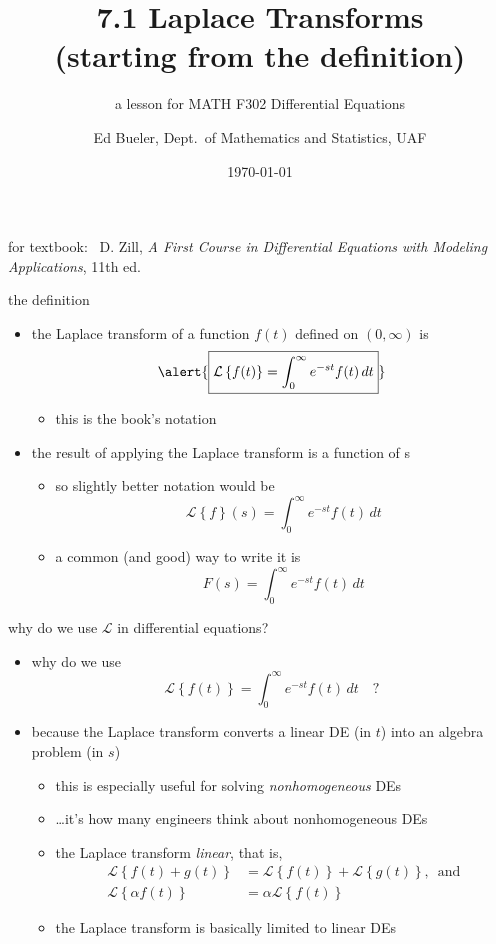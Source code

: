 \documentclass[urlcolor=blue,dvipsnames]{beamer}
\title{7.1 Laplace Transforms \\ (starting from the definition)}
\subtitle{a lesson for MATH F302 Differential Equations}
\author{Ed Bueler, Dept.~of Mathematics and Statistics, UAF}
\date{\tiny \today}
\begin{document}
\renewcommand{\thefootnote}{{\color{green} \arabic{footnote}}}

\begin{frame}
\titlepage

\centerline{\tiny for textbook: \, D. Zill, \emph{A First Course in Differential Equations with Modeling Applications}, 11th ed.}
\end{frame}

\newcommand{\LL}[1]{\mathcal{L}\left\{#1\right\}}

\begin{frame}{the definition}

\begin{itemize}
\item the \alert{Laplace transform} of a function $f(t)$ defined on $(0,\infty)$ is
    $$\alert{\boxed{\LL{f(t)} = \int_0^\infty e^{-st} f(t)\,dt}}$$

\vspace{-2mm}
    \begin{itemize}
    \item this is the book's notation
    \end{itemize}
\item the \alert{result} of applying the Laplace transform \alert{is a function of s}
    \begin{itemize}
    \item  so slightly better notation would be
    $$\LL{f}(s) = \int_0^\infty e^{-st} f(t)\,dt$$
    \item a common (and good) way to write it is
    $$F(s) = \int_0^\infty e^{-st} f(t)\,dt$$
    \end{itemize}
\end{itemize}
\end{frame}


\begin{frame}{why do we use $\mathcal{L}$ in differential equations?}

\begin{itemize}
\item why do we use
    $$\LL{f(t)} = \int_0^\infty e^{-st} f(t)\,dt \quad?$$
\item because the Laplace transform \alert{converts a linear DE} (in $t$) \alert{into an algebra problem} (in $s$)
    \begin{itemize}
    \item this is especially useful for solving \emph{nonhomogeneous} DEs
    \item \dots it's how many engineers think about nonhomogeneous DEs
    \item the Laplace transform \emph{linear}, that is,
\begin{align*}
\LL{f(t) + g(t)} &= \LL{f(t)} + \LL{g(t)}, \, \text{ and} \\
\LL{\alpha f(t)} &= \alpha \LL{f(t)}
\end{align*}
    \item the Laplace transform is basically limited to linear DEs
    \end{itemize}
\end{itemize}
\end{frame}
\end{document}
